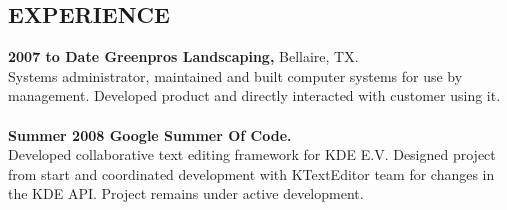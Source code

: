 \documentclass[11pt]{res}
\begin{document}
\begin{resume}
\section{EXPERIENCE} {\bf 2007 to Date Greenpros Landscaping,} Bellaire, TX. \\
                     Systems administrator, maintained and built computer systems for use by management.  Developed product and directly interacted with customer using it. \\
                     \\
                     {\bf Summer 2008 Google Summer Of Code.} \\
                     Developed collaborative text editing framework for KDE E.V.  Designed project from start and coordinated development with KTextEditor team for changes in the KDE API.  Project remains under active development.
\end{resume} 
\end{document}
